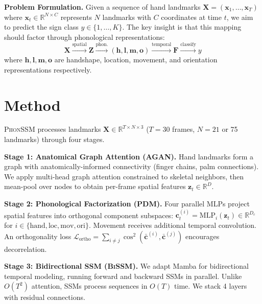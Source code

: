 \documentclass[runningheads]{llncs}
\newcommand{\phonssm}{\textsc{PhonSSM}}
\newcommand{\agan}{\textsc{AGAN}}
\newcommand{\pdm}{\textsc{PDM}}
\newcommand{\bissm}{\textsc{BiSSM}}
\begin{document}
\textbf{Problem Formulation.}
Given a sequence of hand landmarks $\mathbf{X} = (\mathbf{x}_1, \ldots, \mathbf{x}_T)$ where $\mathbf{x}_t \in \mathbb{R}^{N \times C}$ represents $N$ landmarks with $C$ coordinates at time $t$, we aim to predict the sign class $y \in \{1, \ldots, K\}$. The key insight is that this mapping should factor through phonological representations:
\begin{equation}
\mathbf{X} \xrightarrow{\text{spatial}} \mathbf{Z} \xrightarrow{\text{phon.}} (\mathbf{h}, \mathbf{l}, \mathbf{m}, \mathbf{o}) \xrightarrow{\text{temporal}} \mathbf{F} \xrightarrow{\text{classify}} y
\end{equation}
where $\mathbf{h}, \mathbf{l}, \mathbf{m}, \mathbf{o}$ are handshape, location, movement, and orientation representations respectively.

\section{Method}
\label{sec:method}

\phonssm{} processes landmarks $\mathbf{X} \in \mathbb{R}^{T \times N \times 3}$ ($T{=}30$ frames, $N{=}21$ or 75 landmarks) through four stages.

\textbf{Stage 1: Anatomical Graph Attention (\agan{}).} Hand landmarks form a graph with anatomically-informed connectivity (finger chains, palm connections). We apply multi-head graph attention \cite{velivckovic2018graph} constrained to skeletal neighbors, then mean-pool over nodes to obtain per-frame spatial features $\mathbf{z}_t \in \mathbb{R}^{D}$.

\textbf{Stage 2: Phonological Factorization (\pdm{}).} Four parallel MLPs project spatial features into orthogonal component subspaces: $\mathbf{c}_t^{(i)} = \text{MLP}_i(\mathbf{z}_t) \in \mathbb{R}^{D_c}$ for $i \in \{\text{hand}, \text{loc}, \text{mov}, \text{ori}\}$. Movement receives additional temporal convolution. An orthogonality loss $\mathcal{L}_{\text{ortho}} = \sum_{i \neq j} \cos^2(\bar{\mathbf{c}}^{(i)}, \bar{\mathbf{c}}^{(j)})$ encourages decorrelation.

\textbf{Stage 3: Bidirectional SSM (\bissm{}).} We adapt Mamba \cite{gu2023mamba} for bidirectional temporal modeling, running forward and backward SSMs in parallel. Unlike $O(T^2)$ attention, SSMs process sequences in $O(T)$ time. We stack 4 layers with residual connections.
\end{document}

